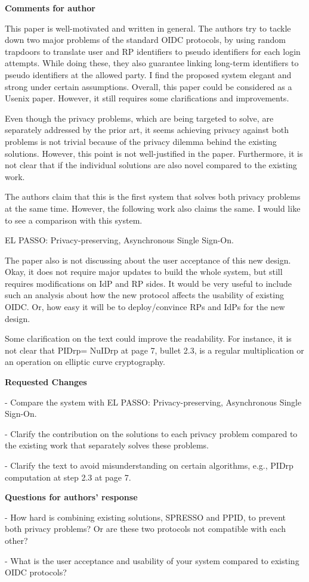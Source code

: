 \documentclass[letterpaper,onecolumn,10pt]{article}
\begin{document}
\vspace{1mm}\noindent\textbf{Comments for author}


This paper is well-motivated and written in general. The authors try to tackle down two major problems of the standard OIDC protocols, by using random trapdoors to translate user and RP identifiers to pseudo identifiers for each login attempts. While doing these, they also guarantee linking long-term identifiers to pseudo identifiers at the allowed party. I find the proposed system elegant and strong under certain assumptions. Overall, this paper could be considered as a Usenix paper. However, it still requires some clarifications and improvements.

Even though the privacy problems, which are being targeted to solve, are separately addressed by the prior art, it seems achieving privacy against both problems is not trivial because of the privacy dilemma behind the existing solutions. However, this point is not well-justified in the paper. Furthermore, it is not clear that if the individual solutions are also novel compared to the existing work.

The authors claim that this is the first system that solves both privacy problems at the same time. However, the following work also claims the same. I would like to see a comparison with this system.

EL PASSO: Privacy-preserving, Asynchronous Single Sign-On.

The paper also is not discussing about the user acceptance of this new design. Okay, it does not require major updates to build the whole system, but still requires modifications on IdP and RP sides. It would be very useful to include such an analysis about how the new protocol affects the usability of existing OIDC. Or, how easy it will be to deploy/convince RPs and IdPs for the new design.

Some clarification on the text could improve the readability. For instance, it is not clear that PIDrp= NuIDrp at page 7, bullet 2.3, is a regular multiplication or an operation on elliptic curve cryptography.

\vspace{1mm}\noindent\textbf{Requested Changes}


-	Compare the system with EL PASSO: Privacy-preserving, Asynchronous Single Sign-On.

-	Clarify the contribution on the solutions to each privacy problem compared to the existing work that separately solves these problems.

-	Clarify the text to avoid misunderstanding on certain algorithms, e.g., PIDrp computation at step 2.3 at page 7.

\vspace{1mm}\noindent\textbf{Questions for authors' response}


-	How hard is combining existing solutions, SPRESSO and PPID, to prevent both privacy problems? Or are these two protocols not compatible with each other?

-	What is the user acceptance and usability of your system compared to existing OIDC protocols?
\end{document}
